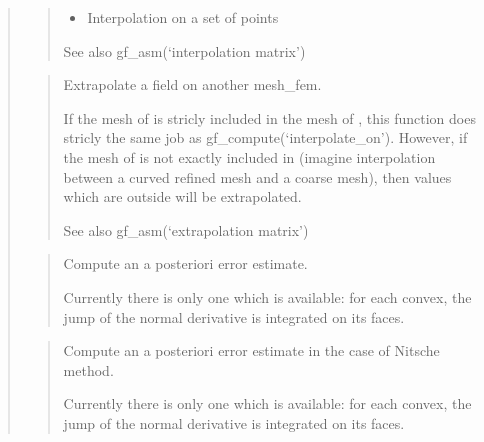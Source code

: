 \documentclass[a4paper,11pt,english]{sphinxmanual}
\begin{document}
\begin{quote}
\begin{quote}
\begin{itemize}
\begin{description}
\end{description}

\item {} 
\sphinxAtStartPar
Interpolation on a set of points 

\end{itemize}

\sphinxAtStartPar
See also gf\_asm(‘interpolation matrix’)
\end{quote}

\sphinxAtStartPar
{}
\begin{quote}

\sphinxAtStartPar
Extrapolate a field on another mesh\_fem.

\sphinxAtStartPar
If the mesh of  is stricly included in the mesh of , this
function does stricly the same job as gf\_compute(‘interpolate\_on’).
However, if the mesh of  is not exactly included in 
(imagine interpolation between a curved refined mesh and a coarse
mesh), then values which are outside  will be
extrapolated.

\sphinxAtStartPar
See also gf\_asm(‘extrapolation matrix’)
\end{quote}

\sphinxAtStartPar
{}
\begin{quote}

\sphinxAtStartPar
Compute an a posteriori error estimate.

\sphinxAtStartPar
Currently there is only one which is available: for each convex,
the jump of the normal derivative is integrated on its faces.
\end{quote}

\sphinxAtStartPar
{}
\begin{quote}

\sphinxAtStartPar
Compute an a posteriori error estimate in the case of Nitsche method.

\sphinxAtStartPar
Currently there is only one which is available: for each convex,
the jump of the normal derivative is integrated on its faces.
\end{quote}


\end{quote}
\end{document}
